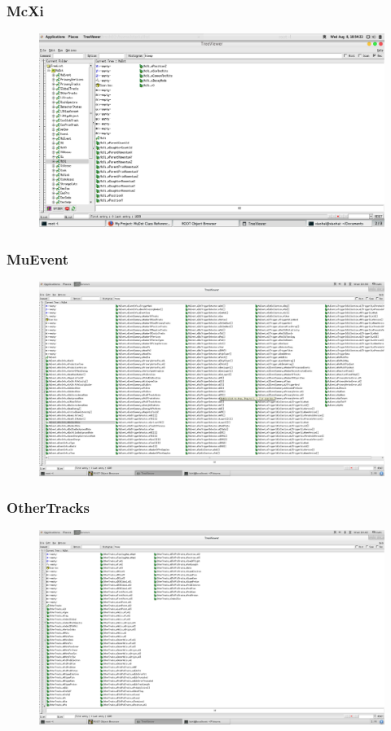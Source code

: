\documentclass[10pt]{beamer}
\begin{document}
\label{McXi}
\begin{frame}
  \frametitle{McXi}
  \begin{figure}[hbtp]
    \centering
    \includegraphics[width=\textwidth]{McXi.png}
  \end{figure}
\end{frame}
\label{MuEvent}
\begin{frame}
  \frametitle{MuEvent}
  \begin{figure}[hbtp]
    \centering
    \includegraphics[width=\textwidth]{MuEvent.png}
  \end{figure}
\end{frame}
\label{OtherTracks}
\begin{frame}
  \frametitle{OtherTracks}
  \begin{figure}[hbtp]
    \centering
    \includegraphics[width=\textwidth]{OtherTracks.png}
  \end{figure}
\end{frame}
\end{document}
